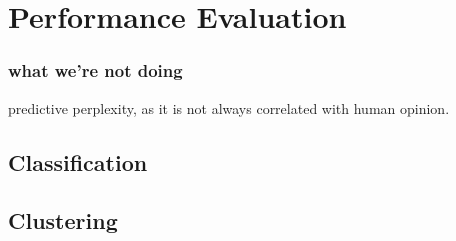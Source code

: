 
\chapter{Performance Evaluation} %

\label{Chapter6} %

\subsection{what we're not doing}
predictive perplexity, as it is not always correlated with human opinion.
\section{Classification}


\section{Clustering}







